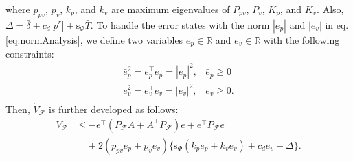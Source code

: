 \documentclass[letterpaper, 10 pt, conference]{ieeeconf}  %
\begin{document}
where $p_{pv}$, $p_v$, $k_p$, and $k_v$ are maximum eigenvalues of $P_{pv}$, $P_v$, $K_p$, and $K_v$.
Also, $\Delta = \bar{\delta}+c_d|\dot{p}^r| + \bar{\text{s}}_\Phi\bar{T}$.
To handle the error states with the norm $|e_p|$ and $|e_v|$ in eq. \eqref{eq:normAnalysis}, we define two variables $\bar{e}_p\in\mathbb{R}$ and $\bar{e}_v\in\mathbb{R}$ with the following constraints:
\begin{equation}
\begin{array}{ll}
\bar{e}_p^2 = e_p^\top e_p = |e_p|^2, & \bar{e}_p \geq 0 \\
\bar{e}_v^2 = e_v^\top e_v = |e_v|^2, & \bar{e}_v \geq 0. \\
\end{array} \nonumber 
\end{equation} 
Then, $\dot{V}_\mathcal{F}$ is further developed as follows:
\begin{align}
\dot{V}_\mathcal{F} &\leq -e^\top( P_\mathcal{F}A + A^\top P_\mathcal{F}) e + e^\top \dot{P}_\mathcal{F}e  \label{eq:aaa}\\
 &\;\;\;\;+2(p_{pv}\bar{e}_p+p_v\bar{e}_v)\{\bar{\text{s}}_\Phi(k_p\bar{e}_p+k_v\bar{e}_v) + c_d\bar{e}_v + \Delta\}. \nonumber 
\end{align}
\end{document}
